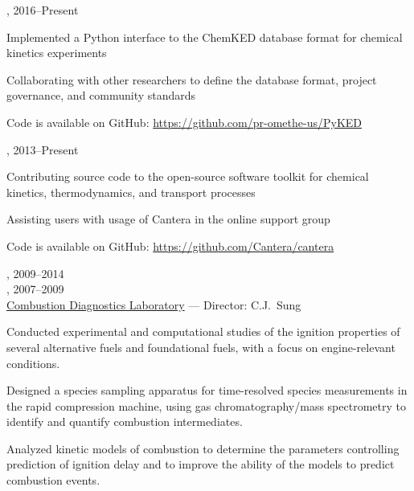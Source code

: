 \vspace{\baselineskip}

,  \hfill 2016--Present

\begin{innerlist}
    \item Implemented a Python interface to the ChemKED database format for chemical kinetics experiments
    \item Collaborating with other researchers to define the database format, project governance, and community standards
    \item Code is available on GitHub: \url{https://github.com/pr-omethe-us/PyKED}
\end{innerlist}

\vspace{\baselineskip}

,  \hfill 2013--Present

\begin{innerlist}
    \item Contributing source code to the open-source software toolkit for chemical kinetics, thermodynamics, and transport processes
    \item Assisting users with usage of Cantera in the online support group
    \item Code is available on GitHub: \url{https://github.com/Cantera/cantera}
\end{innerlist}

\vspace{\baselineskip}

,  \hfill 2009--2014\\
,  \hfill 2007--2009\\
\href{http://combdiaglab.engr.uconn.edu}{Combustion Diagnostics Laboratory} --- Director: C.J.\ Sung

\begin{innerlist}
    \item Conducted experimental and computational studies of the ignition
    properties of several alternative fuels and foundational fuels, with
    a focus on engine-relevant conditions.
    \item Designed a species sampling apparatus for time-resolved
    species measurements in the rapid compression machine, using gas
    chromatography/mass spectrometry to identify and quantify
    combustion intermediates.
    \item Analyzed kinetic models of combustion to determine the parameters
    controlling prediction of ignition delay and to improve the ability of
    the models to predict combustion events.
\end{innerlist}

